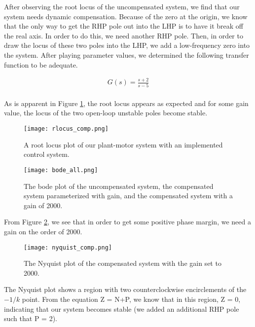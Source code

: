 \documentclass[onecolumn, draftclass]{IEEEtran} %
\begin{document}
After observing the root locus of the uncompensated system, we find that our system needs dynamic compensation.  Because of the zero at the origin, we know that the only way to get the RHP pole out into the LHP is to have it break off the real axis.  In order to do this, we need another RHP pole.  Then, in order to draw the locus of these two poles into the LHP, we add a low-frequency zero into the system.  After playing parameter values, we determined the following transfer function to be adequate.

\begin{eqnarray}
G(s) = \frac{s+2}{s-5}\\
\end{eqnarray}

As is apparent in Figure \ref{rlocus_comp}, the root locus appears as expected and for some gain value, the locus of the two open-loop unstable poles become stable.

\begin{figure}[h]
\begin{center}
\texttt{[image: rlocus\_comp.png]}
\caption{A root locus plot of our plant-motor system with an implemented control system.}
\label{rlocus_comp}
\end{center}
\end{figure}

\begin{figure}[h]
\begin{center}
\texttt{[image: bode\_all.png]}
\caption{The bode plot of the uncompensated system, the compensated system parameterized with gain, and the compensated system with a gain of 2000.}
\label{bode}
\end{center}
\end{figure}

From Figure \ref{bode}, we see that in order to get some positive phase margin, we need a gain on the order of 2000.

\begin{figure}[h]
\begin{center}
\texttt{[image: nyquist\_comp.png]}
\caption{The Nyquist plot of the compensated system with the gain set to 2000.}
\label{nyquist}
\end{center}
\end{figure}

The Nyquist plot shows a region with two counterclockwise encirclements of the $-1/k$ point.  From the equation Z = N+P, we know that in this region, Z = 0, indicating that our system becomes stable (we added an additional RHP pole such that P = 2).
\end{document}
